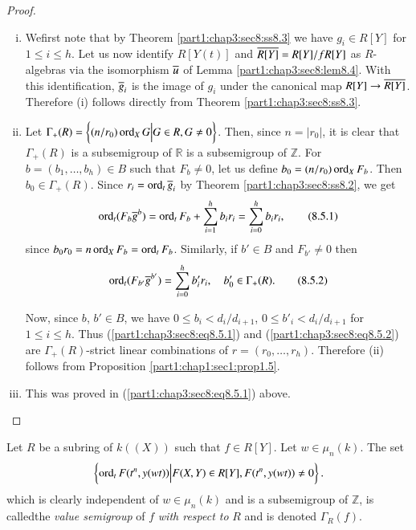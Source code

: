 \begin{proof}
~
\begin{enumerate}[(i)]
\item We\pageoriginale first note that by Theorem
  \ref{part1:chap3:sec8:ss8.3} we have $g_i \in R[Y]$ for $1 \leq i
  \leq h$. Let us now identify $R[Y(t)]$ and $\overline{R[Y]}= R[Y]/fR[Y]$
  as $R$-algebras via the isomorphism $\overline{u}$ of
  Lemma \ref{part1:chap3:sec8:lem8.4}. With this identification,
  $\overline{g}_i$ is the image of $g_i$ under the canonical map $R[Y]\to
  \overline{R[Y]}$. Therefore (i) follows directly from Theorem
  \ref{part1:chap3:sec8:ss8.3}. 
\item Let $\Gamma_+ (R) = \left\{ (n/r_0) \operatorname{ord}_X G \Big| G \in R, G
  \neq 0 \right\}$. Then, since $n= |r_0|$, it is clear that
  $\Gamma_+(R)$ is a subsemigroup of $\mathbb{R}$ is a subsemigroup of
  $\mathbb{Z}$. For $b= (b_1, \ldots, b_h) \in B$ such that $F_b \neq
  0$, let us define $b_0= (n/r_0) \operatorname{ord}_X F_b$. Then $b_0 \in \Gamma_+
  (R)$. Since $r_i= \operatorname{ord}_t\overline{g}_i$ by Theorem
  \ref{part1:chap3:sec8:ss8.2}, we get 
\begin{equation*}
  \operatorname{ord}_t (F_b \overline{g}^b) = \operatorname{ord}_t F_b + \sum^h_{i=1} b_i r_i = \sum^h_{i=0} b_i r_i, \tag{8.5.1} \label{part1:chap3:sec8:eq8.5.1}
\end{equation*}
since $b_0 r_0 =n \operatorname{ord}_X F_b= \operatorname{ord}_t F_b$. Similarly, if $b' \in B$ and $F_{b'} \neq 0$ then
\begin{equation*}
  \operatorname{ord}_t (F_{b'} \overline{g}^{b'}) = \sum^h_{i=0} b'_i r_i, \quad b'_0 \in \Gamma_+ (R). \tag{8.5.2} \label{part1:chap3:sec8:eq8.5.2}
\end{equation*}

Now, since $b$, $b' \in B$, we have $0 \leq b_i < d_{i}/d_{i+1}$, $0 \leq b'_i < d_i /d_{i+1}$ for $1 \leq i \leq h$. Thus (\ref{part1:chap3:sec8:eq8.5.1}) and (\ref{part1:chap3:sec8:eq8.5.2}) are $\Gamma_+ (R)$-strict linear combinations of $r = (r_0, \ldots , r_h)$. Therefore (ii) follows from Proposition \ref{part1:chap1:sec1:prop1.5}. 
\item This was proved in (\ref{part1:chap3:sec8:eq8.5.1}) above.
\end{enumerate}
\end{proof}

\setcounter{thm}{5}
\begin{defi}\label{part1:chap3:sec8:def8.6}
  Let $R$ be a subring of $k((X))$ such that $f \in R[Y]$. Let $w \in \mu_n (k)$. The set
$$
\left\{ \operatorname{ord}_t F(t^n, y(wt)) \Big| F(X, Y) \in R[Y], F(t^n, y(wt))\neq 0 \right\}.
$$
which is clearly independent of $w \in \mu_n (k)$ and is a subsemigroup of $\mathbb{Z}$, is called\pageoriginale the {\em value semigroup} of $f$ {\em with respect to} $R$ and is denoted $\Gamma_R(f)$.
\end{defi}

